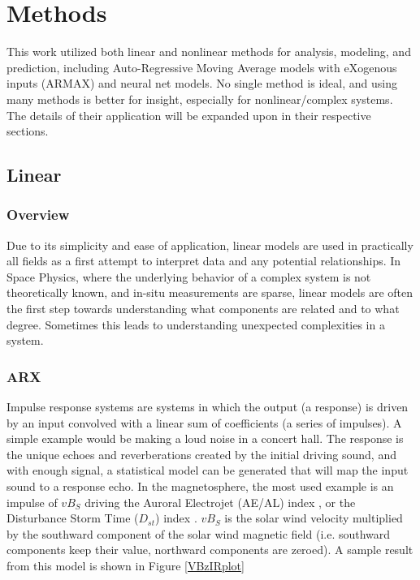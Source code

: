 \chapter[Models]{Methods}

This work utilized both linear and nonlinear methods for analysis, modeling, and prediction, including Auto-Regressive Moving Average models with eXogenous inputs (ARMAX) and neural net models. No single method is ideal, and using many methods is better for insight, especially for nonlinear/complex systems. The details of their application will be expanded upon in their respective sections.

\section{Linear}

\subsection{Overview}
Due to its simplicity and ease of application, linear models are used in practically all fields as a first attempt to interpret data and any potential relationships. In Space Physics, where the underlying behavior of a complex system is not theoretically known, and in-situ measurements are sparse, linear models are often the first step towards understanding what components are related and to what degree. Sometimes this leads to understanding unexpected complexities in a system.


\subsection{ARX}

Impulse response systems are systems in which the output (a response) is driven by an input convolved with a linear sum of coefficients (a series of impulses). A simple example would be making a loud noise in a concert hall. The response is the unique echoes and reverberations created by the initial driving sound, and with enough signal, a statistical model can be generated that will map the input sound to a response echo. In the magnetosphere, the most used example is an impulse of $vB_S$ driving the Auroral Electrojet (AE/AL) index \citep{VBzAL}, or the Disturbance Storm Time ($D_{st}$) index \citep{VBzDST}. $vB_S$ is the solar wind velocity multiplied by the southward component of the solar wind magnetic field (i.e. southward components keep their value, northward components are zeroed). A sample result from this model is  shown in Figure \ref{VBzIRplot}

